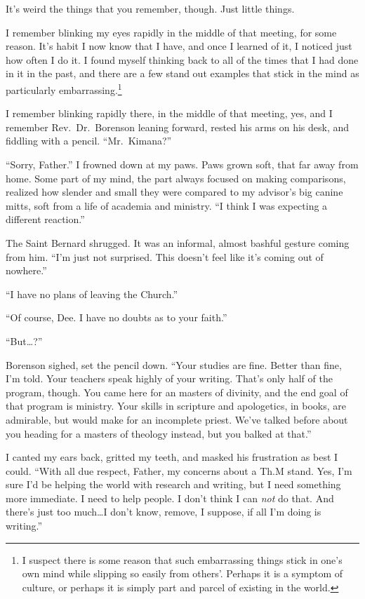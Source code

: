 It's weird the things that you remember, though. Just little things.

I remember blinking my eyes rapidly in the middle of that meeting, for some reason. It's habit I now know that I have, and once I learned of it, I noticed just how often I do it. I found myself thinking back to all of the times that I had done in it in the past, and there are a few stand out examples that stick in the mind as particularly embarrassing.\footnote{I suspect there is some reason that such embarrassing things stick in one's own mind while slipping so easily from others'. Perhaps it is a symptom of culture, or perhaps it is simply part and parcel of existing in the world.}

I remember blinking rapidly there, in the middle of that meeting, yes, and I remember Rev.~Dr.~Borenson leaning forward, rested his arms on his desk, and fiddling with a pencil. ``Mr.~Kimana?''

``Sorry, Father.'' I frowned down at my paws. Paws grown soft, that far away from home. Some part of my mind, the part always focused on making comparisons, realized how slender and small they were compared to my advisor's big canine mitts, soft from a life of academia and ministry. ``I think I was expecting a different reaction.''

The Saint Bernard shrugged. It was an informal, almost bashful gesture coming from him. ``I'm just not surprised. This doesn't feel like it's coming out of nowhere.''

``I have no plans of leaving the Church.''

``Of course, Dee. I have no doubts as to your faith.''

``But\ldots?''

Borenson sighed, set the pencil down. ``Your studies are fine. Better than fine, I'm told. Your teachers speak highly of your writing. That's only half of the program, though. You came here for an masters of divinity, and the end goal of that program is ministry. Your skills in scripture and apologetics, in books, are admirable, but would make for an incomplete priest. We've talked before about you heading for a masters of theology instead, but you balked at that.''

I canted my ears back, gritted my teeth, and masked his frustration as best I could. ``With all due respect, Father, my concerns about a Th.M stand. Yes, I'm sure I'd be helping the world with research and writing, but I need something more immediate. I need to help people. I don't think I can \emph{not} do that. And there's just too much\ldots I don't know, remove, I suppose, if all I'm doing is writing.''

